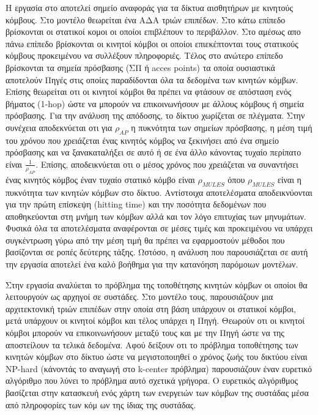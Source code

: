 Η εργασία στο \cite{data_mules} αποτελεί σημείο αναφοράς για τα δίκτυα αισθητήρων με κινητούς κόμβους. Στο μοντέλο θεωρείται ένα ΑΔΑ τριών επιπέδων. Στο κάτω επίπεδο
βρίσκονται οι στατικοί κομοι οι οποίοι επιβλέπουν το περιβάλλον. Στο αμέσως απο πάνω επίπεδο βρίσκονται οι κινητοί κόμβοι οι οποίοι επιεκέπτονται τους στατικούς
κόμβους προκειμένου να συλλέξουν πληροφοριές. Τέλος στο ανώτερο επίπεδο βρίσκονται τα σημεία πρόσβασης (ΣΠ ή acces points) τα οποία ουσιαστικά αποτελούν Πηγές στις
οποίες παραδίδονται όλα τα δεδομένα των κινητών κόμβων. Επίσης θεωρείται οτι οι κινητοί κόμβοι θα πρέπει να φτάσουν σε απόσταση ενός βήματος (1-hop) ώστε να μπορούν
να επικοινωνήσουν με άλλους κόμβους ή σημεία πρόσβασης. Για την ανάλυση της απόδοσης, το δίκτυο χωρίζεται σε πλέγματα. Στην συνέχεια αποδεκνύεται οτι για $\rho_{AP}$
η πυκνότητα των σημείων πρόσβασης, η μέση τιμή του χρόνου που χρειάζεται ένας κινητός κόμβος να ξεκινήσει από ένα σημείο πρόσβασης και να ξανακαταλήξει σε αυτό ή σε
ένα άλλο κάνοντας τυχαίο περίπατο είναι $\frac{1}{\rho_{AP}}$. Επίσης, αποδεικνύεται οτι ο μέσος χρόνος που χρειάζεται να συναντήσει ένας κινητός κόμβος έναν τυχαίο
στατικό κόμβο είναι $\rho_{MULES}$ όπου $\rho_{MULES}$ είναι η πυκνότητα των κινητών κόμβων στο δίκτυο. Αντίστοιχα αποτελέσματα αποδεικνύονται για την πρώτη επίσκεψη
(hitting time) και την ποσότητα δεδομένων που αποθηκεύονται στη μνήμη των κόμβων αλλά και τον λόγο επιτυχίας των μηνυμάτων. Φυσικά όλα τα αποτελέσματα αναφέρονται σε
μέσες τιμές και προκειμένου να υπάρχει συγκέντρωση γύρω από την μέση τιμή θα πρέπει να εφαρμοστούν μέθοδοι που βασίζονται σε ροπές δεύτερης τάξης. Ωστόσο, η ανάλυση
που παρουσιάζεται σε αυτή την εργασία αποτελεί ένα καλό βοήθημα για την κατανόηση παρόμοιων μοντέλων.

Στην εργασία \cite{yuanyuan1} αναλύεται το πρόβλημα της τοποθέτησης κινητών κόμβων οι οποίοι θα λειτουργούν ως αρχηγοί σε συστάδες. Στο μοντέλο τους, παρουσιάζουν
μια αρχιτεκτονική τριών επιπέδων στην οποία στη βάση υπάρχουν οι στατικοί κόμβοι, μετά υπάρχουν οι κινητοί κόμβοι και τέλος υπάρχει η Πηγή. Θεωρούν οτι οι
κινητοί κόμβοι μπορούν να επικοινωνήσουν μεταξύ τους και με την Πηγή ώστε να της αποστείλουν τα τελικά δεδομένα. Αφού δείξουν οτι το πρόβλημα τοποθέτησης των κινητών
κόμβων στο δίκτυο ώστε να μεγιστοποιηθεί ο χρόνος ζωής του δικτύου είναι NP-hard (κάνοντάς το αναγωγή στο k-center πρόβλημα) παρουσιάζουν έναν ευρετικό αλγόριθμο που
λύνει το πρόβλημα αυτό σχετικά γρήγορα. Ο ευρετικός αλγόριθμος βασίζεται στην κατασκευή ενός χάρτη των ενεργειών των κόμβων της συστάδας μέσα από πληροφορίες των κόμ
ων της ίδιας της συστάδας.



